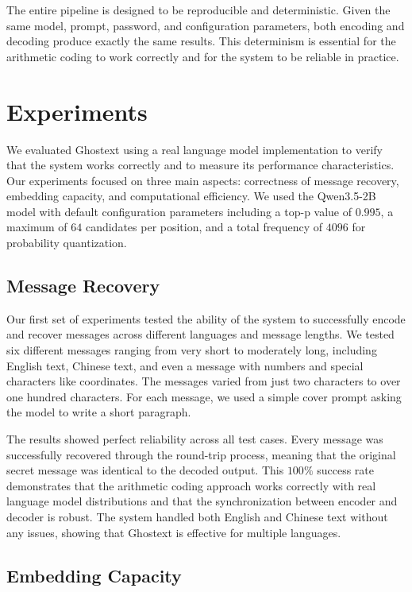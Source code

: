 \documentclass[sigconf,review,anonymous]{acmart}
\begin{document}
{The entire pipeline is designed to be reproducible and deterministic. Given the same model, prompt, password, and configuration parameters, both encoding and decoding produce exactly the same results. This determinism is essential for the arithmetic coding to work correctly and for the system to be reliable in practice.

\section{Experiments}

We evaluated Ghostext using a real language model implementation to verify that the system works correctly and to measure its performance characteristics. Our experiments focused on three main aspects: correctness of message recovery, embedding capacity, and computational efficiency. We used the Qwen3.5-2B model with default configuration parameters including a top-p value of $0.995$, a maximum of $64$ candidates per position, and a total frequency of $4096$ for probability quantization.

\subsection{Message Recovery}

Our first set of experiments tested the ability of the system to successfully encode and recover messages across different languages and message lengths. We tested six different messages ranging from very short to moderately long, including English text, Chinese text, and even a message with numbers and special characters like coordinates. The messages varied from just two characters to over one hundred characters. For each message, we used a simple cover prompt asking the model to write a short paragraph.

The results showed perfect reliability across all test cases. Every message was successfully recovered through the round-trip process, meaning that the original secret message was identical to the decoded output. This $100\%$ success rate demonstrates that the arithmetic coding approach works correctly with real language model distributions and that the synchronization between encoder and decoder is robust. The system handled both English and Chinese text without any issues, showing that Ghostext is effective for multiple languages.

\subsection{Embedding Capacity}

}
\end{document}
